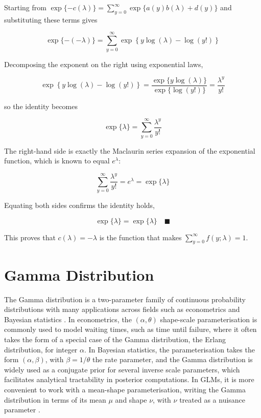 Starting from $\exp\{-c(\lambda)\} = \sum_{y=0}^{\infty}\exp\{a(y)b(\lambda)+d(y)\}$ and substituting these terms gives
\begin{mathbox}
\[
\exp\{-(-\lambda)\} = \sum_{y=0}^{\infty}\exp\left\{y\log(\lambda) - \log(y!)\right\}
\]
\end{mathbox}
Decomposing the exponent on the right using exponential laws,
\begin{mathbox}
\[
\exp\left\{y\log(\lambda) - \log(y!)\right\} = \frac{\exp\{y\log(\lambda)\}}{\exp\{\log(y!)\}} = \frac{\lambda^y}{y!}
\]
\end{mathbox}
so the identity becomes
\begin{mathbox}
\[
\exp\{\lambda\} = \sum_{y=0}^{\infty}\frac{\lambda^y}{y!}
\]
\end{mathbox}
The right-hand side is exactly the Maclaurin series expansion of the exponential function, which is known to equal $e^\lambda$:
\begin{mathbox}
\[
\sum_{y=0}^{\infty}\frac{\lambda^y}{y!} = e^\lambda = \exp\{\lambda\}
\]
\end{mathbox}
Equating both sides confirms the identity holds,
\begin{mathbox}
\[
\exp\{\lambda\} = \exp\{\lambda\} \quad\blacksquare
\]
\end{mathbox}
This proves that $c(\lambda) = -\lambda$ is the function that makes $\sum_{y=0}^{\infty} f(y;\lambda) = 1$.

\section{Gamma Distribution}
The Gamma distribution is a two-parameter family of continuous probability distributions with many applications across fields such as econometrics and Bayesian statistics \citep{casella2002}. In econometrics, the $(\alpha,\theta)$ shape-scale parameterisation is commonly used to model waiting times, such as time until failure, where it often takes the form of a special case of the Gamma distribution, the Erlang distribution, for integer $\alpha$. In Bayesian statistics, the parameterisation takes the form $(\alpha,\beta)$, with $\beta=1/\theta$ the rate parameter, and the Gamma distribution is widely used as a conjugate prior for several inverse scale parameters, which facilitates analytical tractability in posterior computations. In GLMs, it is more convenient to work with a mean-shape parameterisation, writing the Gamma distribution in terms of its mean $\mu$ and shape $\nu$, with $\nu$ treated as a nuisance parameter \citep{dobson2018}.

